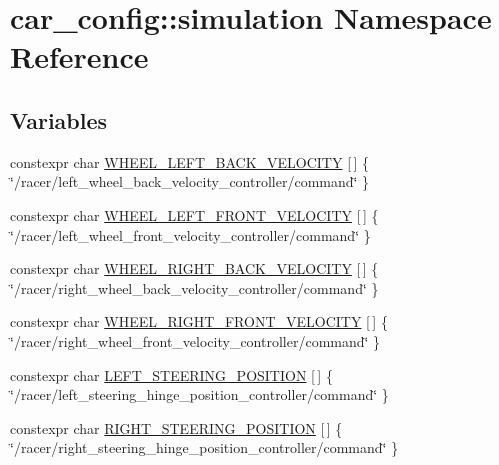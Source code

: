 \hypertarget{namespacecar__config_1_1simulation}{}\section{car\+\_\+config\+:\+:simulation Namespace Reference}
\label{namespacecar__config_1_1simulation}
\subsection*{Variables}
\begin{DoxyCompactItemize}
\item 
constexpr char \hyperlink{namespacecar__config_1_1simulation_ad5b5204b67d98be9a93418b41f9c5e1e}{W\+H\+E\+E\+L\+\_\+\+L\+E\+F\+T\+\_\+\+B\+A\+C\+K\+\_\+\+V\+E\+L\+O\+C\+I\+TY} \mbox{[}$\,$\mbox{]} \{ \char`\"{}/racer/left\+\_\+wheel\+\_\+back\+\_\+velocity\+\_\+controller/command\char`\"{} \}
\item 
constexpr char \hyperlink{namespacecar__config_1_1simulation_a13f0760806f194b285a499947ec01ae3}{W\+H\+E\+E\+L\+\_\+\+L\+E\+F\+T\+\_\+\+F\+R\+O\+N\+T\+\_\+\+V\+E\+L\+O\+C\+I\+TY} \mbox{[}$\,$\mbox{]} \{ \char`\"{}/racer/left\+\_\+wheel\+\_\+front\+\_\+velocity\+\_\+controller/command\char`\"{} \}
\item 
constexpr char \hyperlink{namespacecar__config_1_1simulation_a824b4ee5d2b14eb92a017605678ada71}{W\+H\+E\+E\+L\+\_\+\+R\+I\+G\+H\+T\+\_\+\+B\+A\+C\+K\+\_\+\+V\+E\+L\+O\+C\+I\+TY} \mbox{[}$\,$\mbox{]} \{ \char`\"{}/racer/right\+\_\+wheel\+\_\+back\+\_\+velocity\+\_\+controller/command\char`\"{} \}
\item 
constexpr char \hyperlink{namespacecar__config_1_1simulation_ad0fb8a1c1f51bc790b995c81b07a04ea}{W\+H\+E\+E\+L\+\_\+\+R\+I\+G\+H\+T\+\_\+\+F\+R\+O\+N\+T\+\_\+\+V\+E\+L\+O\+C\+I\+TY} \mbox{[}$\,$\mbox{]} \{ \char`\"{}/racer/right\+\_\+wheel\+\_\+front\+\_\+velocity\+\_\+controller/command\char`\"{} \}
\item 
constexpr char \hyperlink{namespacecar__config_1_1simulation_a0547cf8102d3f1d49eab8cc27c199247}{L\+E\+F\+T\+\_\+\+S\+T\+E\+E\+R\+I\+N\+G\+\_\+\+P\+O\+S\+I\+T\+I\+ON} \mbox{[}$\,$\mbox{]} \{ \char`\"{}/racer/left\+\_\+steering\+\_\+hinge\+\_\+position\+\_\+controller/command\char`\"{} \}
\item 
constexpr char \hyperlink{namespacecar__config_1_1simulation_a4f5267acab1b061953937bc84a7a6e28}{R\+I\+G\+H\+T\+\_\+\+S\+T\+E\+E\+R\+I\+N\+G\+\_\+\+P\+O\+S\+I\+T\+I\+ON} \mbox{[}$\,$\mbox{]} \{ \char`\"{}/racer/right\+\_\+steering\+\_\+hinge\+\_\+position\+\_\+controller/command\char`\"{} \}
\end{DoxyCompactItemize}


